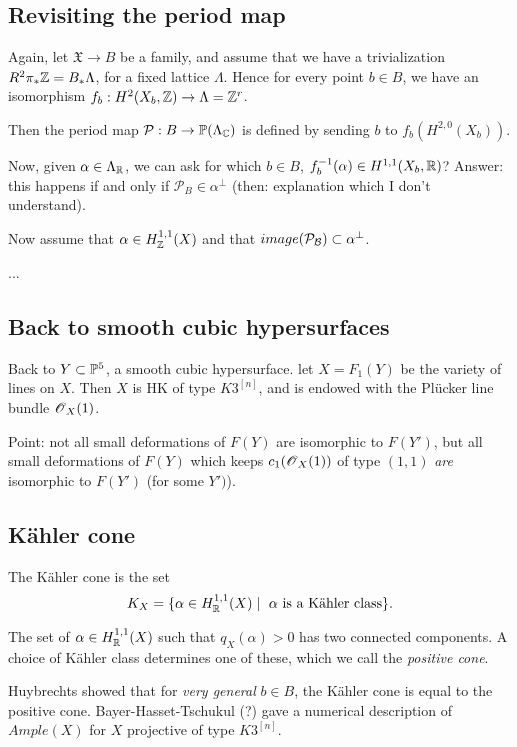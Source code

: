 \documentclass[11pt, english]{article}
\begin{document}
\subsection{Revisiting the period map}

Again, let $\mathfrak X \to B$ be a family, and assume that we have a trivialization $R^2 \pi_\ast \mathbb{Z} = B_\ast \Lambda$, for a fixed lattice $\Lambda$. Hence for every point $b \in B$, we have an isomorphism $f_b:H^2(X_b, \mathbb{Z}) \to \Lambda = \mathbb{Z}^r$.

Then the period map $\mathcal P: B \to \mathbb{P}(\Lambda_{\mathbb{C}})$ is defined  by sending $b$ to $f_b(H^{2,0}(X_b))$. 

Now, given $\alpha \in \Lambda_{\mathbb{R}}$, we can ask for which $b \in B$, $f_b^{-1}(\alpha) \in H^{1,1}(X_b, \mathbb{R})$? Answer: this happens if and only if $\mathcal P_B \in \alpha^\perp$ (then: explanation which I don't understand).

Now assume that $\alpha \in H_{\mathbb{Z}}^{1,1}(X)$ and that $image(\mathcal P_{\mathcal{B}}) \subset \alpha^\perp$.

...

\subsection{Back to smooth cubic hypersurfaces}

Back to $Y \subset \mathbb{P}^5$, a smooth cubic hypersurface. let $X=F_1(Y)$ be the variety of lines on $X$. Then $X$ is HK of type $K3^{[n]}$, and is endowed with the Plücker line bundle $\operatorname{\mathscr{O}}_X(1)$. 

Point: not all small deformations of $F(Y)$ are isomorphic to $F(Y')$, but all small deformations of $F(Y)$ which keeps $c_1(\operatorname{\mathscr{O}}_X(1))$ of type $(1,1)$ \emph{are} isomorphic to $F(Y')$ (for some $Y')$). 

\subsection{Kähler cone}

The Kähler cone is the set
$$
K_X = \{ \alpha \in H_{\mathbb{R}}^{1,1}(X) \mid \text{ $\alpha$ is a Kähler class}\}.
$$

The set of $\alpha \in H^{1,1}_{\mathbb{R}}(X)$ such that $q_X(\alpha) > 0$ has two connected components. A choice of Kähler class determines one of these, which we call the \emph{positive cone}.

Huybrechts showed that for \emph{very general} $b \in B$, the Kähler cone is equal to the positive cone. Bayer-Hasset-Tschukul (?) gave a numerical description of $Ample(X)$ for $X$ projective of type $K3^{[n]}$.
\end{document}
